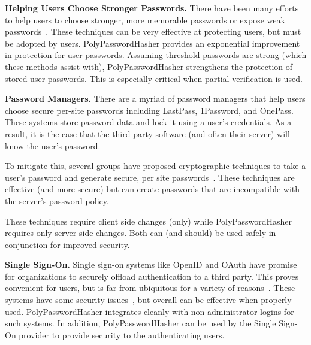 %


{\bf Helping Users Choose Stronger Passwords.}
There have been many efforts to help users to choose stronger,
more memorable passwords or expose weak 
passwords~\cite{topkara2007passwords,klein1990foiling,bishop1995improving,
schechter2010popularity,
komanduri2011passwords, shay2010encountering, xkcdpassword}.   These 
techniques can be very effective at protecting users,
but must be adopted by users.
PolyPasswordHasher provides an exponential improvement in protection for user 
passwords.   Assuming threshold passwords are strong
(which these methods assist with), PolyPasswordHasher strengthens the
protection of stored user passwords.   This is especially critical when
partial verification is used.

{\bf Password Managers.}
There are a myriad of password managers that help users choose secure
per-site passwords including LastPass, 1Password, and OnePass.   These
systems store password data and lock it using a user's credentials.   As a
result, it is the case that the third party software (and often their server)
will know the user's password.

To mitigate this, several groups have proposed cryptographic techniques
to take a user's password and generate secure, per site 
passwords~\cite{halderman2009lest,ross2005stronger, halderman2005convenient}.
These techniques are effective (and more secure) but can create passwords that 
are incompatible with the server's password policy.

These techniques require client side changes (only) while PolyPasswordHasher
requires only server side changes.   Both can (and should) be used safely 
in conjunction for improved security.


{\bf Single Sign-On.}
Single sign-on systems like OpenID and OAuth have promise for organizations to
securely offload authentication
to a third party.   This proves convenient for users, but is far from 
ubiquitous for a variety of reasons~\cite{sun2010billion}.  These
systems have some security issues~\cite{openidsecurity,oauthsecurity}, but
overall can be effective when properly used.   PolyPasswordHasher integrates 
cleanly with non-administrator logins for such systems.   In addition,
PolyPasswordHasher can be used by the Single Sign-On provider to provide 
security to the authenticating users.

